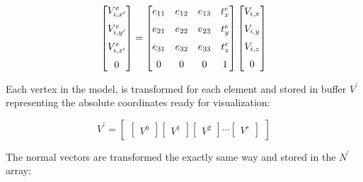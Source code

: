 \begin{equation}
\begin{bmatrix} 
V^e_{i,x'} \vspace{2mm} \\ 
V^e_{i,y'} \vspace{2mm} \\ 
V^e_{i,z'} \vspace{2mm} \\ 
0 
\end{bmatrix} 
=
\begin{bmatrix} 
e_{11} & e_{12} & e_{13} & t^e_x  \vspace{2mm} \\
e_{21} & e_{22} & e_{23} & t^e_y  \vspace{2mm} \\
e_{31} & e_{32} & e_{33} & t^e_z  \vspace{2mm} \\
0 & 0 & 0 & 1 
\end{bmatrix} 
\begin{bmatrix} 
V_{i,x} \vspace{2mm} \\ 
V_{i,y} \vspace{2mm} \\ 
V_{i,z} \vspace{2mm} \\ 
0 
\end{bmatrix} 
\end{equation}

Each vertex in the model, is transformed for each element and stored
in buffer $V^\prime$ representing the absolute coordinates ready for
visualization:

\begin{equation}
\label{eq:absolute_model_vertices}
V^\prime = 
\begin{bmatrix} 
\begin{bmatrix} 
V^0
\end{bmatrix} 
\begin{bmatrix} 
V^1
\end{bmatrix} 
\begin{bmatrix} 
V^2
\end{bmatrix} 
\dotsb
\begin{bmatrix} 
V^e
\end{bmatrix} 
\end{bmatrix} 
\end{equation} 

The normal vectors are transformed the exactly same way
and stored in the $N^\prime$ array:

